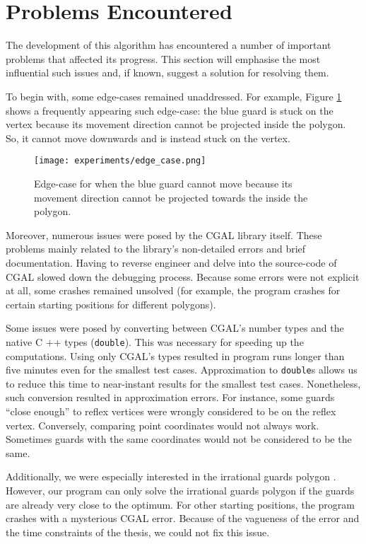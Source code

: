 \section{Problems Encountered}
\label{sec:problems}
The development of this algorithm has encountered a number of important problems that affected its progress. This section will emphasise the most influential such issues and, if known, suggest a solution for resolving them.

To begin with, some edge-cases remained unaddressed. For example, Figure \ref{fig:edge} shows a frequently appearing such edge-case: the blue guard is stuck on the vertex because its movement direction cannot be projected inside the polygon. So, it cannot move downwards and is instead stuck on the vertex.

\begin{figure}[h!]
    \centering
    \texttt{[image: experiments/edge\_case.png]}
    \caption{Edge-case for when the blue guard cannot move because its movement direction cannot be projected towards the inside the polygon.}
    \label{fig:edge}
\end{figure}

Moreover, numerous issues were posed by the CGAL library itself. These problems mainly related to the library's non-detailed errors and brief documentation. Having to reverse engineer and delve into the source-code of CGAL slowed down the debugging process. Because some errors were not explicit at all, some crashes remained unsolved (for example, the program crashes for certain starting positions for different polygons). 

Some issues were posed by converting between CGAL's number types and the native C ++ types (\texttt{double}). This was necessary for speeding up the computations. Using only CGAL's types resulted in program runs longer than five minutes even for the smallest test cases. Approximation to \texttt{double}s allows us to reduce this time to near-instant results for the smallest test cases. Nonetheless, such conversion resulted in approximation errors. For instance, some guards ``close enough'' to reflex vertices were wrongly considered to be on the reflex vertex. Conversely, comparing point coordinates would not always work. Sometimes guards with the same coordinates would not be considered to be the same.

Additionally, we were especially interested in the irrational guards polygon \cite{abrahamsen2021art}. However, our program can only solve the irrational guards polygon if the guards are already very close to the optimum. For other starting positions, the program crashes with a mysterious CGAL error. Because of the vagueness of the error and the time constraints of the thesis, we could not fix this issue.


